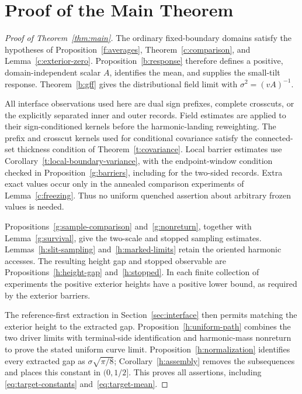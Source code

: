 \documentclass[11pt]{article}
\theoremstyle{definition}
\theoremstyle{remark}
\numberwithin{equation}{section}
\begin{document}
\section{Proof of the Main Theorem}\label{sec:assembly}
\begin{proof}[Proof of Theorem~\ref{thm:main}]
The ordinary fixed-boundary domains satisfy the hypotheses of
Proposition~\ref{f:averages}, Theorem~\ref{c:comparison}, and
Lemma~\ref{c:exterior-zero}. Proposition~\ref{b:response} therefore
defines a positive, domain-independent scalar $A$, identifies the mean,
and supplies the small-tilt response. Theorem~\ref{b:gff} gives the
distributional field limit with $\sigma^2=(vA)^{-1}$.

All interface observations used here are dual sign prefixes, complete
crosscuts, or the explicitly separated inner and outer records.
Field estimates are applied to their sign-conditioned kernels before
the harmonic-landing reweighting. The prefix and crosscut kernels
used for conditional covariance satisfy the connected-set thickness
condition of Theorem~\ref{t:covariance}. Local barrier estimates use
Corollary~\ref{t:local-boundary-variance}, with the endpoint-window
condition checked in Proposition~\ref{g:barriers}, including for the
two-sided records. Extra exact values occur only in the annealed
comparison experiments of Lemma~\ref{c:freezing}. Thus no uniform
quenched assertion about arbitrary frozen values is needed.

Propositions~\ref{g:sample-comparison} and~\ref{g:nonreturn}, together
with Lemma~\ref{g:survival}, give the two-scale and stopped sampling
estimates. Lemmas~\ref{h:slit-sampling} and~\ref{h:marked-limits}
retain the oriented harmonic accesses. The resulting height gap and
stopped observable are Propositions~\ref{h:height-gap} and~\ref{h:stopped}.
In each finite collection of experiments the positive exterior heights
have a positive lower bound, as required by the exterior barriers.

The reference-first extraction in Section~\ref{sec:interface} then
permits matching the exterior height to the extracted gap.
Proposition~\ref{h:uniform-path} combines the two driver limits with
terminal-side identification and harmonic-mass nonreturn to prove
the stated uniform curve limit. Proposition~\ref{h:normalization}
identifies every extracted gap as $\sigma\sqrt{\pi/8}$;
Corollary~\ref{h:assembly} removes the subsequences and places this
constant in $(0,1/2]$. This proves all assertions, including
\eqref{eq:target-constants} and~\eqref{eq:target-mean}.
\end{proof}
\end{document}
